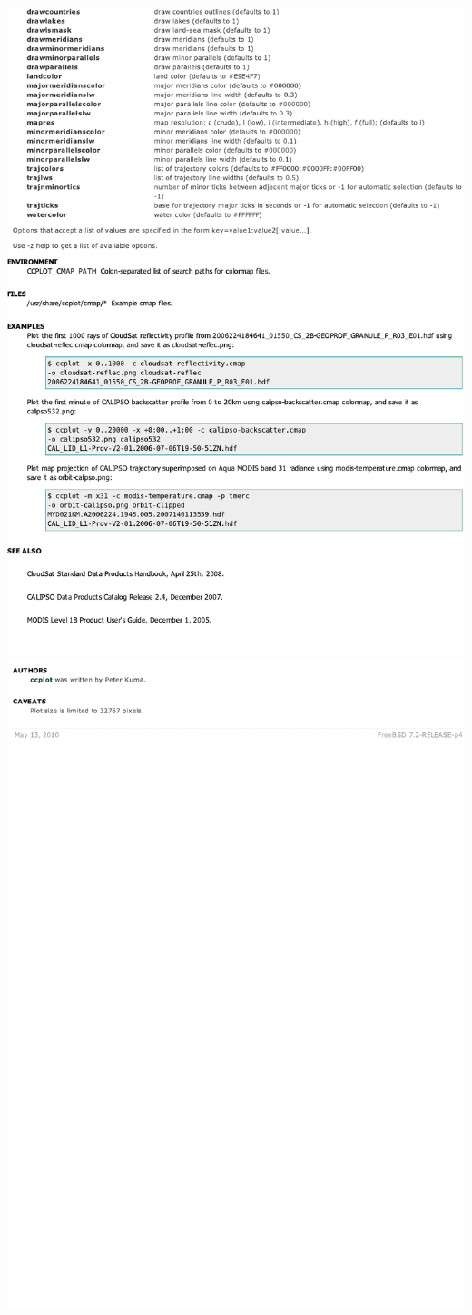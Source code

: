 \includegraphics[width=\textwidth]{images/ccplot-page3.pdf}
\clearpage
\includegraphics[width=\textwidth]{images/ccplot-page4.pdf}
